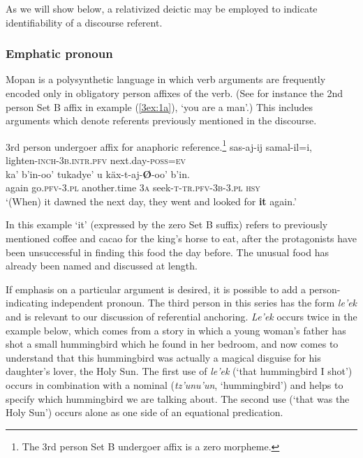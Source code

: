 \documentclass[output=paper]{langsci/langscibook}
\begin{document}
As we will show below, a relativized deictic may be employed to indicate identifiability of a discourse referent.

\subsubsection{Emphatic pronoun}\label{3sec:212}

Mopan is a polysynthetic language in which verb arguments are frequently encoded only in obligatory person affixes of the verb.  (See for instance the 2nd person Set B affix in example (\ref{3ex:1a}), `you are a man'.) This includes arguments which denote referents previously mentioned in the discourse.

\begin{exe}
\ex\label{3ex:5}
3rd person undergoer affix for anaphoric reference.\footnote{The 3rd person Set B undergoer affix is a zero morpheme.} 
\exi{}
\gll	sas-aj-ij 					samal-il=i, \\
	lighten-{\textsc{inch-3b.intr.pfv}}	next.day-{\textsc{poss=ev}} \\
\glt
\exi{}
\gll	ka' 		b'in-oo'			tukadye' 		u 		k\"ax-t-aj-{\textbf{\O}}-oo' 		b'in.	\\
	again	go.{\textsc{pfv-3.pl}}	another.time	{\textsc{3a}}	seek-{\textsc{t-tr.pfv-3b-3.pl}}	{\textsc{hsy}} \\
\glt	`(When) it dawned the next day, they went and looked for {\textbf{it}} again.'
\end{exe}

In this example `it' (expressed by the zero Set B suffix) refers to previously mentioned coffee and cacao for the king's horse to eat, after the protagonists have been unsuccessful in finding this food the day before. The unusual food has already been named and discussed at length.

If emphasis on a particular argument is desired, it is possible to add a person-indicating independent pronoun. The third person in this series has the form {\emph{le'ek}} and is relevant to our discussion of referential anchoring. {\emph{Le'ek}} occurs twice in the example below, which comes from a story in which a young woman's father has shot a small hummingbird which he found in her bedroom, and now comes to understand that this hummingbird was actually a magical disguise for his daughter's lover, the Holy Sun. The first use of {\emph{le'ek}} (`that hummingbird I shot') occurs in combination with a nominal ({\emph{tz'unu'un}}, `hummingbird') and helps to specify which hummingbird we are talking about. The second use (`that was the Holy Sun') occurs alone as one side of an equational predication.
\end{document}
